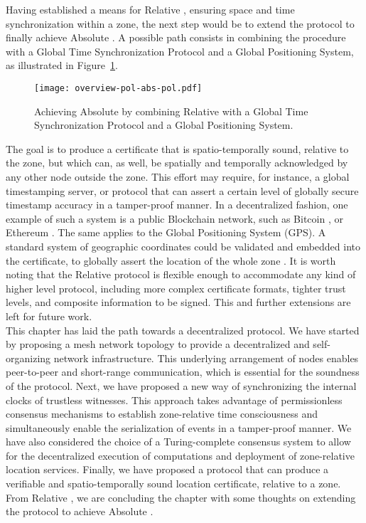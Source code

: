 Having established a means for Relative \pol{}, ensuring space and time synchronization within a zone, the next step would be to extend the protocol to finally achieve Absolute \pol{}. A possible path consists in combining the procedure with a Global Time Synchronization Protocol and a Global Positioning System, as illustrated in Figure~\ref{fig:proof-of-location-overview-absolute-pol}.

\begin{figure}[h!]
    \begin{center}
    \texttt{[image: overview-pol-abs-pol.pdf]}
    \caption{Achieving Absolute \pol{} by combining Relative \pol{} with a Global Time Synchronization Protocol and a Global Positioning System.}
    \label{fig:proof-of-location-overview-absolute-pol}
    \end{center}
\end{figure}

The goal is to produce a \pol{} certificate that is spatio-temporally sound, relative to the zone, but which can, as well, be spatially and temporally acknowledged by any other node outside the zone. This effort may require, for instance, a global timestamping server, or protocol that can assert a certain level of globally secure timestamp accuracy in a tamper-proof manner. In a decentralized fashion, one example of such a system is a public Blockchain network, such as Bitcoin \cite{nakamoto2008bitcoin}, or Ethereum \cite{buterin2014next}. The same applies to the Global Positioning System (GPS). A standard system of geographic coordinates could be validated and embedded into the \pol{} certificate, to globally assert the location of the whole zone \cite{amoretti2018blockchain ,nosouhi2020blockchain}. It is worth noting that the Relative \pol{} protocol is flexible enough to accommodate any kind of higher level protocol, including more complex certificate formats, tighter trust levels, and composite information to be signed. This and further extensions are left for future work. \\

This chapter has laid the path towards a decentralized \pol{} protocol. We have started by proposing a mesh network topology to provide a decentralized and self-organizing network infrastructure. This underlying arrangement of nodes enables peer-to-peer and short-range communication, which is essential for the soundness of the protocol. Next, we have proposed a new way of synchronizing the internal clocks of trustless witnesses. This approach takes advantage of permissionless consensus mechanisms to establish zone-relative time consciousness and simultaneously enable the serialization of events in a tamper-proof manner. We have also considered the choice of a Turing-complete consensus system to allow for the decentralized execution of computations and deployment of zone-relative location services. Finally, we have proposed a \pol{} protocol that can produce a verifiable and spatio-temporally sound location certificate, relative to a zone. From Relative \pol{}, we are concluding the chapter with some thoughts on extending the protocol to achieve Absolute \pol{}.
